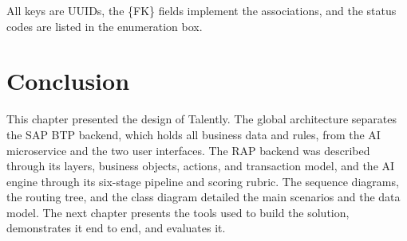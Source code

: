 All keys are UUIDs, the \{FK\} fields implement the associations, and the status codes are listed in the enumeration box.

\section*{Conclusion}

This chapter presented the design of Talently. The global architecture separates the SAP BTP backend, which holds all business data and rules, from the AI microservice and the two user interfaces. The RAP backend was described through its layers, business objects, actions, and transaction model, and the AI engine through its six-stage pipeline and scoring rubric. The sequence diagrams, the routing tree, and the class diagram detailed the main scenarios and the data model. The next chapter presents the tools used to build the solution, demonstrates it end to end, and evaluates it.

\fussy
